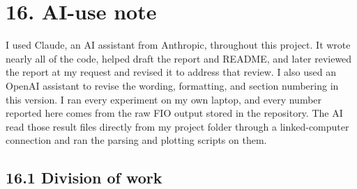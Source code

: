 \documentclass[10pt,letterpaper]{article}
\begin{document}
\par\noindent\begin{minipage}{\linewidth}
\section*{16. AI-use note}

I used Claude, an AI assistant from Anthropic, throughout this project. It wrote nearly all of the code, helped draft the report and README, and later reviewed the report at my request and revised it to address that review. I also used an OpenAI assistant to revise the wording, formatting, and section numbering in this version. I ran every experiment on my own laptop, and every number reported here comes from the raw FIO output stored in the repository. The AI read those result files directly from my project folder through a linked-computer connection and ran the parsing and plotting scripts on them.


\par\noindent\begin{minipage}{\linewidth}
\subsection*{16.1 Division of work}


\end{minipage}
\end{minipage}
\end{document}
